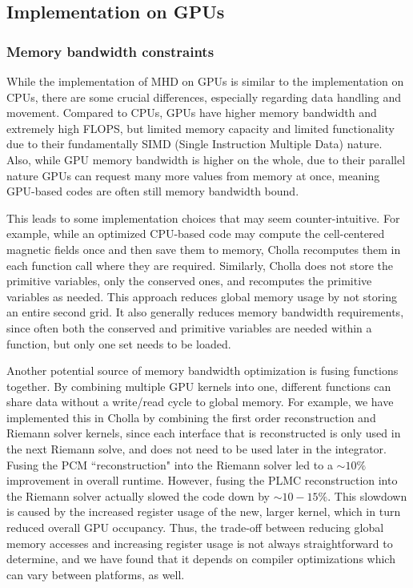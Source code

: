 \documentclass[modern, linenumbers]{aastex631}
\begin{document}
\subsection{Implementation on GPUs}
\label{sec:gpu-vs-cpu}

\subsubsection{Memory bandwidth constraints}
While the implementation of MHD on GPUs is similar to the implementation on CPUs, there are some crucial differences, especially regarding data handling and movement. Compared to CPUs, GPUs have higher memory bandwidth and extremely high FLOPS, but limited memory capacity and limited functionality due to their fundamentally SIMD (Single Instruction Multiple Data) nature. Also, while GPU memory bandwidth is higher on the whole, due to their parallel nature GPUs can request many more values from memory at once, meaning GPU-based codes are often still memory bandwidth bound.

This leads to some implementation choices that may seem counter-intuitive. For example, while an optimized CPU-based code may compute the cell-centered magnetic fields once and then save them to memory, Cholla recomputes them in each function call where they are required. Similarly, Cholla does not store the primitive variables, only the conserved ones, and recomputes the primitive variables as needed. This approach reduces global memory usage by not storing an entire second grid. It also generally reduces memory bandwidth requirements, since often both the conserved and primitive variables are needed within a function, but only one set needs to be loaded.

Another potential source of memory bandwidth optimization is fusing functions together. By combining multiple GPU kernels into one, different functions can share data without a write/read cycle to global memory. For example, we have implemented this in Cholla by combining the first order reconstruction and Riemann solver kernels, since each interface that is reconstructed is only used in the next Riemann solve, and does not need to be used later in the integrator. Fusing the PCM ``reconstruction" into the Riemann solver led to a $\sim 10\%$ improvement in overall runtime. However, fusing the PLMC reconstruction into the Riemann solver actually slowed the code down by $\sim 10-15\%$. This slowdown is caused by the increased register usage of the new, larger kernel, which in turn reduced overall GPU occupancy. Thus, the trade-off between reducing global memory accesses and increasing register usage is not always straightforward to determine, and we have found that it depends on compiler optimizations which can vary between platforms, as well.
\end{document}
